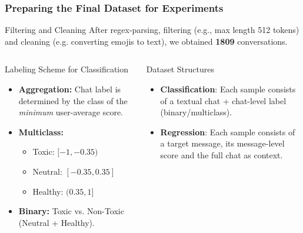 \documentclass[aspectratio=169]{beamer}
\begin{document}
\begin{frame}
  \frametitle{Preparing the Final Dataset for Experiments}
  
  \begin{block}{Filtering and Cleaning}
    After regex-parsing, filtering (e.g., max length 512 tokens) and cleaning (e.g. converting emojis to text), we obtained \textbf{1809} conversations.
  \end{block}

  \begin{columns}
    \pause
    \begin{column}[T]{0.45\textwidth}
      \begin{block}{Labeling Scheme for Classification}
        \begin{itemize}
            \item \textbf{Aggregation:} Chat label is determined by the class of the \textit{minimum} user-average score.
            \item \textbf{Multiclass:}
            \begin{itemize}
                \item Toxic: $[-1, -0.35)$
                \item Neutral: $[-0.35, 0.35]$
                \item Healthy: $(0.35, 1]$
            \end{itemize}
            \item \textbf{Binary:} Toxic vs. Non-Toxic (Neutral + Healthy).
        \end{itemize}
      \end{block}
    \end{column}
    \pause
    \begin{column}[T]{0.45\textwidth}
      \begin{block}{Dataset Structures}
        \begin{itemize}
            \item \textbf{Classification}: Each sample consists of a textual chat + chat-level label (binary/multiclass).
            \item \textbf{Regression}: Each sample consists of a target message, its message-level score and the full chat as context.
        \end{itemize}
      \end{block}
    \end{column}
  \end{columns}
  
\end{frame}
\end{document}
